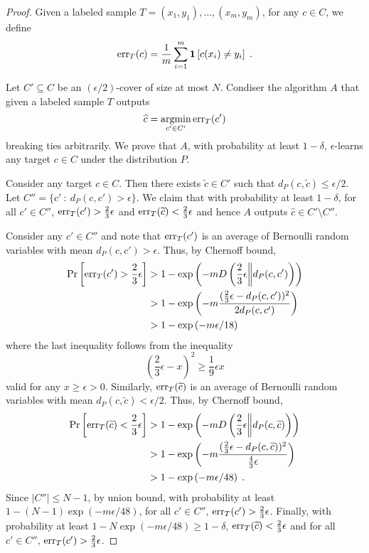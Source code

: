 \begin{proof}
Given a labeled sample $T = (x_1, y_1), \dots, (x_m, y_m)$, for any $c \in C$,
we define
$$
\operatorname{err}_T(c) = \frac{1}{m} \sum_{i=1}^m \mathbf{1}\left[{c(x_i) \neq y_i}\right] \; .
$$

Let $C' \subseteq C$ be an $(\epsilon/2)$-cover of size at most $N$.
Condiser the algorithm $A$ that given a labeled sample $T$ outputs
$$
\widehat c = \operatorname*{argmin}_{c' \in C'} \operatorname{err}_T(c')
$$
breaking ties arbitrarily. We prove that $A$, with probability at least
$1-\delta$, $\epsilon$-learns any target $c \in C$ under the distribution $P$.

Consider any target $c \in C$. Then there exists $\widetilde c \in C'$ such that
$d_P(c,\widetilde c) \le \epsilon/2$. Let $C'' = \{ c' ~:~ d_P(c,c') > \epsilon \}$.
We claim that with probability at least $1 - \delta$, for all $c' \in C''$,
$\operatorname{err}_T(c') > \frac{2}{3} \epsilon$ and $\operatorname{err}_T(\widetilde{c}) <
\frac{2}{3}\epsilon$ and hence $A$ outputs $\widehat c \in C' \setminus C''$.

Consider any $c' \in C''$ and note that $\operatorname{err}_T(c')$ is an average of Bernoulli
random variables with mean $d_P(c,c') > \epsilon$. Thus, by Chernoff bound,
\begin{align*}
\Pr \left[ \operatorname{err}_T(c') > \frac{2}{3} \epsilon \right]
& > 1 - \exp \left( - m D\left(\frac{2}{3} \epsilon \middle\| d_P(c,c') \right) \right) \\
& > 1 - \exp \left( - m \frac{(\frac{2}{3} \epsilon - d_P(c,c'))^2}{2 d_P(c,c')} \right) \\
& > 1 - \exp \left( - m \epsilon/18 \right)
\end{align*}
where the last inequality follows from the inequality
$$
\left( \frac{2}{3} \epsilon - x \right)^2 \ge \frac{1}{9} \epsilon x
$$
valid for any $x \ge \epsilon > 0$.
Similarly, $\operatorname{err}_T(\widetilde{c})$ is an average of Bernoulli random variables with mean $d_P(c, \widetilde{c}) < \epsilon/2$.
Thus, by Chernoff bound,
\begin{align*}
\Pr \left[ \operatorname{err}_T(\widetilde{c}) < \frac{2}{3} \epsilon \right]
& > 1 - \exp \left( - m D\left(\frac{2}{3} \epsilon \middle\| d_P(c, \widetilde{c}) \right) \right) \\
& > 1 - \exp \left( - m \frac{(\frac{2}{3} \epsilon - d_P(c, \widetilde{c}))^2}{\frac{4}{3} \epsilon} \right) \\
& > 1 - \exp \left( - m \epsilon / 48 \right) \; .
\end{align*}
Since $|C''| \le N - 1$, by union bound, with probability at least $1 - (N - 1)
\exp(-m \epsilon/48)$, for all $c' \in C''$, $\operatorname{err}_T(c') > \frac{2}{3}
\epsilon$. Finally, with probability at least $1 - N \exp(-m \epsilon/48) \ge 1 -
\delta$, $\operatorname{err}_T(\widetilde{c}) < \frac{2}{3}\epsilon$ and for all $c' \in C''$,
$\operatorname{err}_T(c') > \frac{2}{3} \epsilon$.
\end{proof}

